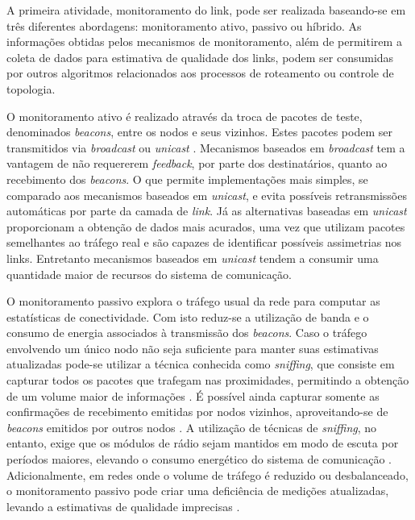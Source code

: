 \documentclass[
	12pt,				%
	openright,			%
	oneside,
	a4paper,			%
	english,			%
	french,				%
	spanish,			%
	brazil				%
	]{abntex2}
\begin{document}
A primeira atividade, monitoramento do link, pode ser realizada baseando-se em três diferentes abordagens: monitoramento ativo, passivo ou híbrido. As informações obtidas pelos mecanismos de monitoramento, além de permitirem a coleta de dados para estimativa de qualidade dos links, podem ser consumidas por outros algoritmos relacionados aos processos de roteamento ou controle de topologia.

O monitoramento ativo é realizado através da troca de pacotes de teste, denominados \textit{beacons}, entre os nodos e seus vizinhos. Estes pacotes podem ser transmitidos via \textit{broadcast} \cite{DeCouto2005} ou \textit{unicast} \cite{Kim2006}. Mecanismos baseados em \textit{broadcast} tem a vantagem de não requererem \textit{feedback}, por parte dos destinatários, quanto ao recebimento dos \textit{beacons}. O que permite implementações mais simples, se comparado aos mecanismos baseados em \textit{unicast}, e evita possíveis retransmissões automáticas por parte da camada de \textit{link}. Já as alternativas baseadas em \textit{unicast} proporcionam a obtenção de dados mais acurados, uma vez que utilizam pacotes semelhantes ao tráfego real \cite{Sang2010} e são capazes de identificar possíveis assimetrias nos links. Entretanto mecanismos baseados em \textit{unicast} tendem a consumir uma quantidade maior de recursos do sistema de comunicação.

O monitoramento passivo explora o tráfego usual da rede para computar as estatísticas de conectividade. Com isto reduz-se a utilização de banda e o consumo de energia associados à transmissão dos \textit{beacons}. Caso o tráfego envolvendo um único nodo não seja suficiente para manter suas estimativas atualizadas pode-se utilizar a técnica conhecida como \textit{sniffing}, que consiste em capturar todos os pacotes que trafegam nas proximidades, permitindo a obtenção de um volume maior de informações \cite{LaI2003,Woo2003}. É possível ainda capturar somente as confirmações de recebimento emitidas por nodos vizinhos, aproveitando-se de \textit{beacons} emitidos por outros nodos \cite{PengJiang2006,YanjunLi2005}. A utilização de técnicas de \textit{sniffing}, no entanto, exige que os módulos de rádio sejam mantidos em modo de escuta por períodos maiores, elevando o consumo energético do sistema de comunicação \cite{LaI2003}. Adicionalmente, em redes onde o volume de tráfego é reduzido ou desbalanceado, o monitoramento passivo pode criar uma deficiência de medições atualizadas, levando a estimativas de qualidade imprecisas \cite{Baccour2012}.
\end{document}
